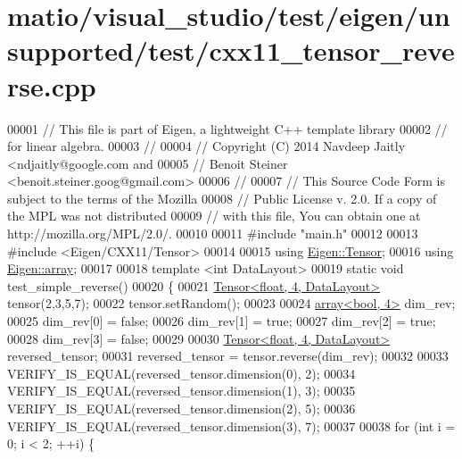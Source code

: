 \hypertarget{matio_2visual__studio_2test_2eigen_2unsupported_2test_2cxx11__tensor__reverse_8cpp_source}{}\section{matio/visual\+\_\+studio/test/eigen/unsupported/test/cxx11\+\_\+tensor\+\_\+reverse.cpp}
\label{matio_2visual__studio_2test_2eigen_2unsupported_2test_2cxx11__tensor__reverse_8cpp_source}

\begin{DoxyCode}
00001 \textcolor{comment}{// This file is part of Eigen, a lightweight C++ template library}
00002 \textcolor{comment}{// for linear algebra.}
00003 \textcolor{comment}{//}
00004 \textcolor{comment}{// Copyright (C) 2014 Navdeep Jaitly <ndjaitly@google.com and}
00005 \textcolor{comment}{//                    Benoit Steiner <benoit.steiner.goog@gmail.com>}
00006 \textcolor{comment}{//}
00007 \textcolor{comment}{// This Source Code Form is subject to the terms of the Mozilla}
00008 \textcolor{comment}{// Public License v. 2.0. If a copy of the MPL was not distributed}
00009 \textcolor{comment}{// with this file, You can obtain one at http://mozilla.org/MPL/2.0/.}
00010 
00011 \textcolor{preprocessor}{#include "main.h"}
00012 
00013 \textcolor{preprocessor}{#include <Eigen/CXX11/Tensor>}
00014 
00015 \textcolor{keyword}{using} \hyperlink{class_eigen_1_1_tensor}{Eigen::Tensor};
00016 \textcolor{keyword}{using} \hyperlink{class_eigen_1_1array}{Eigen::array};
00017 
00018 \textcolor{keyword}{template} <\textcolor{keywordtype}{int} DataLayout>
00019 \textcolor{keyword}{static} \textcolor{keywordtype}{void} test\_simple\_reverse()
00020 \{
00021   \hyperlink{class_eigen_1_1_tensor}{Tensor<float, 4, DataLayout>} tensor(2,3,5,7);
00022   tensor.setRandom();
00023 
00024   \hyperlink{class_eigen_1_1array}{array<bool, 4>} dim\_rev;
00025   dim\_rev[0] = \textcolor{keyword}{false};
00026   dim\_rev[1] = \textcolor{keyword}{true};
00027   dim\_rev[2] = \textcolor{keyword}{true};
00028   dim\_rev[3] = \textcolor{keyword}{false};
00029 
00030   \hyperlink{class_eigen_1_1_tensor}{Tensor<float, 4, DataLayout>} reversed\_tensor;
00031   reversed\_tensor = tensor.reverse(dim\_rev);
00032 
00033   VERIFY\_IS\_EQUAL(reversed\_tensor.dimension(0), 2);
00034   VERIFY\_IS\_EQUAL(reversed\_tensor.dimension(1), 3);
00035   VERIFY\_IS\_EQUAL(reversed\_tensor.dimension(2), 5);
00036   VERIFY\_IS\_EQUAL(reversed\_tensor.dimension(3), 7);
00037 
00038   \textcolor{keywordflow}{for} (\textcolor{keywordtype}{int} i = 0; i < 2; ++i) \{

\end{DoxyCode}

